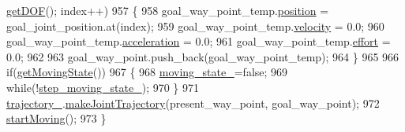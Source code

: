 \begin{DoxyCode}
      \hyperlink{classrobotis__manipulator_1_1_manipulator_a2be640cd5d1fb496f5a6ccd2bb29d781}{getDOF}(); index++)
957   \{
958     goal\_way\_point\_temp.\hyperlink{structrobotis__manipulator_1_1_point_a0f122386b502d9b316bdead542ed2145}{position} = goal\_joint\_position.at(index);
959     goal\_way\_point\_temp.\hyperlink{structrobotis__manipulator_1_1_point_a4eaec95fac0c755eb0aa704b36ebe97b}{velocity} = 0.0;
960     goal\_way\_point\_temp.\hyperlink{structrobotis__manipulator_1_1_point_adb49f1fbcc0eaa7f530c54fdf0ede836}{acceleration} = 0.0;
961     goal\_way\_point\_temp.\hyperlink{structrobotis__manipulator_1_1_point_add1a7019fc87cc2ac9bdf033372a9bb6}{effort} = 0.0;
962 
963     goal\_way\_point.push\_back(goal\_way\_point\_temp);
964   \}
965 
966   \textcolor{keywordflow}{if}(\hyperlink{classrobotis__manipulator_1_1_robotis_manipulator_afa3c8994013b876eb38f22b4128f147a}{getMovingState}())
967   \{
968     \hyperlink{classrobotis__manipulator_1_1_robotis_manipulator_a5b7990548dd779b1ca66a2ad83a74f76}{moving\_state\_}=\textcolor{keyword}{false};
969     \textcolor{keywordflow}{while}(!\hyperlink{classrobotis__manipulator_1_1_robotis_manipulator_aef8766eb10814f57928dcd9e71ceaccf}{step\_moving\_state\_});
970   \}
971   \hyperlink{classrobotis__manipulator_1_1_robotis_manipulator_a992d2c7221bcaab8e9a688d12728d738}{trajectory\_}.\hyperlink{classrobotis__manipulator_1_1_trajectory_a2cd72b326825ebcda3bdf2d52389e30f}{makeJointTrajectory}(present\_way\_point, goal\_way\_point);
972   \hyperlink{classrobotis__manipulator_1_1_robotis_manipulator_a471cb5d00c34dfe28fd260daaf4fd7a7}{startMoving}();
973 \}
\end{DoxyCode}


